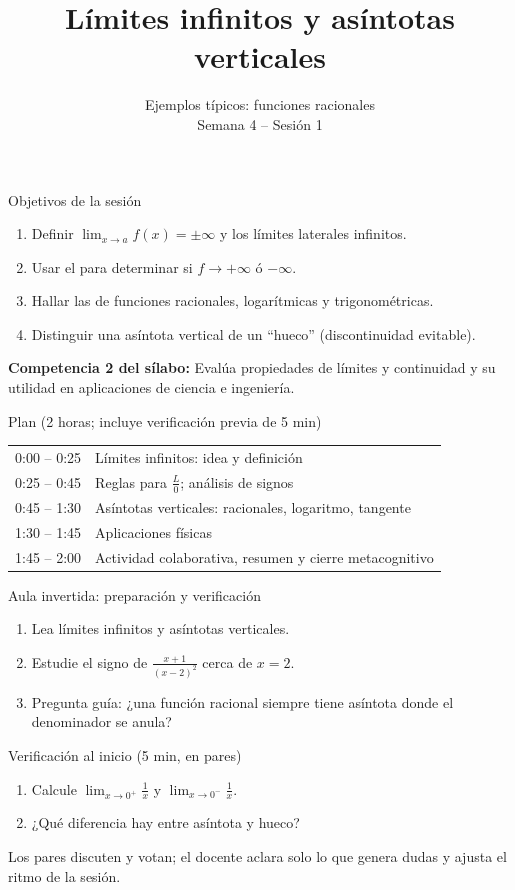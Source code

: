 \documentclass[10pt,aspectratio=169]{beamer}
\title[Asíntotas verticales]{Límites infinitos y asíntotas verticales}
\subtitle{Ejemplos típicos: funciones racionales\\[2pt]\small Semana 4 -- Sesión 1}
\begin{document}
\begin{frame}
  \titlepage
\end{frame}

\begin{frame}{Objetivos de la sesión}
  \begin{enumerate}
    \item Definir $\lim_{x\to a}f(x)=\pm\infty$ y los límites laterales infinitos.
    \item Usar el  para determinar si $f\to+\infty$ ó $-\infty$.
    \item Hallar las  de funciones racionales, logarítmicas y trigonométricas.
    \item Distinguir una asíntota vertical de un ``hueco'' (discontinuidad evitable).
  \end{enumerate}
  \vspace{1mm}
  {\small\textbf{Competencia 2 del sílabo:} Evalúa propiedades de límites y continuidad y su utilidad en aplicaciones de ciencia e ingeniería.}
  \begin{block}{Plan (2 horas; incluye verificación previa de 5 min)}
    \begin{tabular}{ll}
      0:00 -- 0:25 & Límites infinitos: idea y definición\\
      0:25 -- 0:45 & Reglas para $\frac{L}{0}$; análisis de signos\\
      0:45 -- 1:30 & Asíntotas verticales: racionales, logaritmo, tangente\\
      1:30 -- 1:45 & Aplicaciones físicas\\
      1:45 -- 2:00 & Actividad colaborativa, resumen y cierre metacognitivo
    \end{tabular}
  \end{block}
\end{frame}

\begin{frame}{Aula invertida: preparación y verificación}
  \small
  \begin{previa}
    \begin{enumerate}
      \item Lea límites infinitos y asíntotas verticales.
      \item Estudie el signo de $\frac{x+1}{(x-2)^2}$ cerca de $x=2$.
      \item Pregunta guía: ¿una función racional siempre tiene asíntota donde el denominador se anula?
    \end{enumerate}
  \end{previa}
  \begin{block}{Verificación al inicio (5 min, en pares)}
    \begin{enumerate}
      \item Calcule $\lim_{x\to0^+}\frac1x$ y $\lim_{x\to0^-}\frac1x$.
      \item ¿Qué diferencia hay entre asíntota y hueco?
    \end{enumerate}
    Los pares discuten y votan; el docente aclara solo lo que genera dudas y ajusta el ritmo de la sesión.
  \end{block}
\end{frame}
\end{document}
